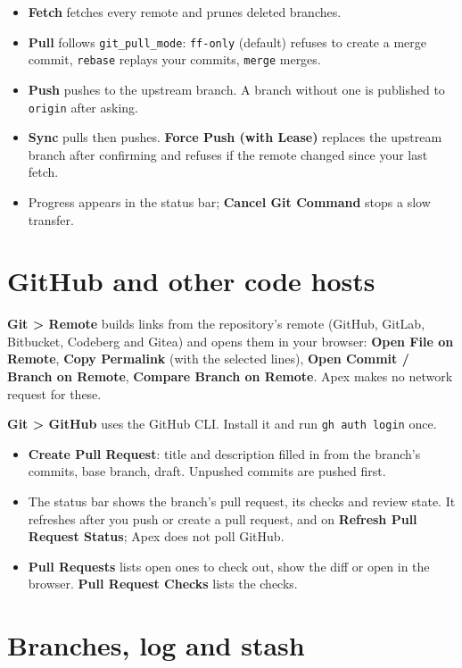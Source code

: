 \documentclass[11pt,a4paper,oneside]{report}
\newcommand{\menu}[1]{\textbf{#1}}
\newcommand{\setting}[1]{\texttt{#1}}
\begin{document}
\begin{itemize}
\item \menu{Fetch} fetches every remote and prunes deleted branches.
\item \menu{Pull} follows \setting{git\_pull\_mode}: \texttt{ff-only}
  (default) refuses to create a merge commit, \texttt{rebase} replays your
  commits, \texttt{merge} merges.
\item \menu{Push} pushes to the upstream branch. A branch without one is
  published to \texttt{origin} after asking.
\item \menu{Sync} pulls then pushes. \menu{Force Push (with Lease)} replaces
  the upstream branch after confirming and refuses if the remote changed
  since your last fetch.
\item Progress appears in the status bar; \menu{Cancel Git Command} stops a
  slow transfer.
\end{itemize}

\section{GitHub and other code hosts}

\menu{Git > Remote} builds links from the repository's remote (GitHub,
GitLab, Bitbucket, Codeberg and Gitea) and opens them in your browser:
\menu{Open File on Remote}, \menu{Copy Permalink} (with the selected lines),
\menu{Open Commit / Branch on Remote}, \menu{Compare Branch on Remote}. Apex
makes no network request for these.

\menu{Git > GitHub} uses the GitHub CLI. Install it and run \texttt{gh auth
login} once.

\begin{itemize}
\item \menu{Create Pull Request}: title and description filled in from the
  branch's commits, base branch, draft. Unpushed commits are pushed first.
\item The status bar shows the branch's pull request, its checks and review
  state. It refreshes after you push or create a pull request, and on
  \menu{Refresh Pull Request Status}; Apex does not poll GitHub.
\item \menu{Pull Requests} lists open ones to check out, show the diff or
  open in the browser. \menu{Pull Request Checks} lists the checks.
\end{itemize}

\section{Branches, log and stash}
\end{document}
